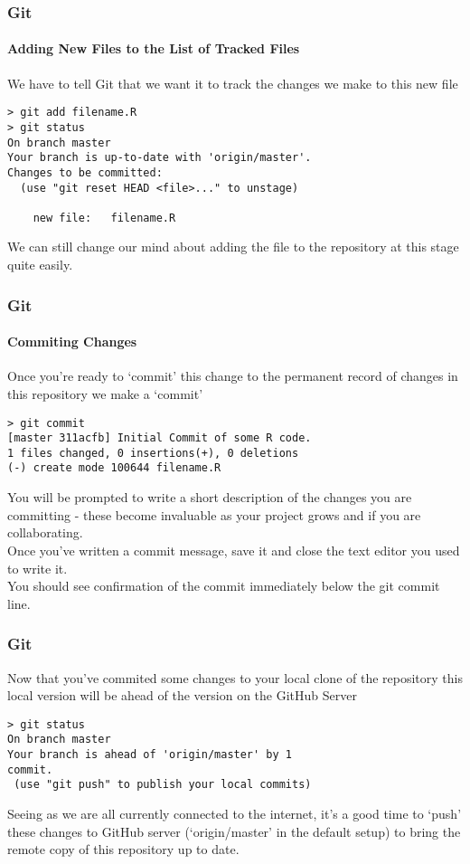\documentclass[xcolor=dvipsnames]{beamer}
\begin{document}
\begin{frame}[fragile]
\frametitle{Git}
\framesubtitle{Adding New Files to the List of Tracked Files}

We have to tell Git that we want it to track the changes we make to this new file
\begin{block}{}
\begin{lstlisting}
> git add filename.R
> git status
On branch master
Your branch is up-to-date with 'origin/master'.
Changes to be committed:
  (use "git reset HEAD <file>..." to unstage)

	new file:   filename.R
\end{lstlisting}
\end{block}
We can still change our mind about adding the file to the repository at this stage quite easily.

\end{frame}

\begin{frame}[fragile]
\frametitle{Git}
\framesubtitle{Commiting Changes}
Once you're ready to `commit' this change to the permanent record of changes in this repository we make a `commit'
\begin{block}{}
\begin{lstlisting}
> git commit
[master 311acfb] Initial Commit of some R code.
1 files changed, 0 insertions(+), 0 deletions
(-) create mode 100644 filename.R
\end{lstlisting}
\end{block}
You will be prompted to write a short description of the changes you are committing - these become invaluable as your project grows and if you are collaborating.\\
Once you've written a commit message, save it and close the text editor you used to write it.\\
You should see confirmation of the commit immediately below the git commit line.
\end{frame}

\begin{frame}[fragile]
\frametitle{Git}
Now that you've commited some changes to your local clone of the repository this local version will be ahead of the version on the GitHub Server
\begin{block}{}
\begin{lstlisting}
> git status
On branch master
Your branch is ahead of 'origin/master' by 1
commit.
 (use "git push" to publish your local commits)
\end{lstlisting}
\end{block}
Seeing as we are all currently connected to the internet, it's a good time to `push' these changes to GitHub server (`origin/master' in the default setup) to bring the remote copy of this repository up to date.
\end{frame}
\end{document}
